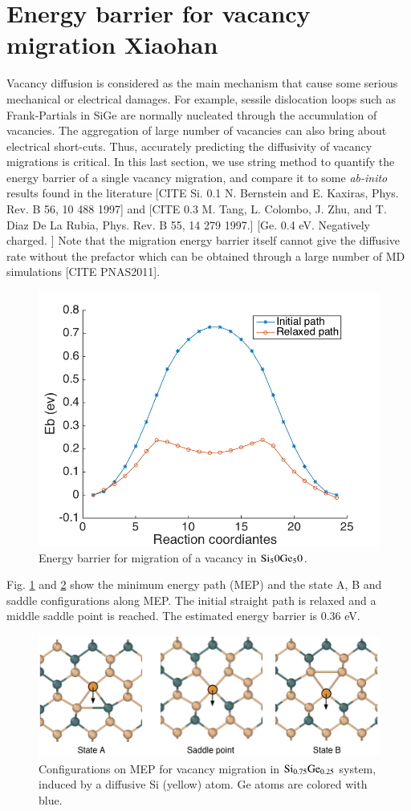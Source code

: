 \documentclass[review]{elsarticle}
\begin{document}
\section{Energy barrier for vacancy migration  {\color{red} Xiaohan}}
\label{sec:vacancy}
Vacancy diffusion is considered as the main mechanism that cause some serious mechanical or electrical damages. For example,  sessile dislocation loops such as Frank-Partials in SiGe are normally nucleated through the accumulation of vacancies. The aggregation of large number of vacancies can also bring about electrical short-cuts. Thus, accurately predicting the diffusivity of vacancy migrations is critical. In this last section, we use string method to quantify the energy barrier of a single vacancy migration, and compare it to some {\it ab-inito} results found in the literature [CITE Si. 0.1 N. Bernstein and E. Kaxiras, Phys. Rev. B 56, 10 488 1997] 
and [CITE 0.3 M. Tang, L. Colombo, J. Zhu, and T. Diaz De La Rubia, Phys. Rev. B 55, 14 279 1997.] [Ge. 0.4 eV. Negatively charged. ] Note that the migration energy barrier itself cannot give the diffusive rate without the prefactor which can be obtained through a large number of MD simulations [CITE PNAS2011]. 

\begin{figure}[H]
\centering
\includegraphics[width=.5\linewidth]{Figures/Eb_migration.png}
\caption{Energy barrier for migration of a vacancy in ${\rm Si_50Ge_50}$.}
\label{fig:Eb_migration}
\end{figure}

Fig. \ref{fig:Eb_migration} and \ref{fig:stateABS} show the minimum energy path (MEP) and the state A, B and saddle configurations along MEP. The initial straight path is relaxed and a middle saddle point is reached. The estimated energy barrier is 0.36 eV. 

\begin{figure}[H]
\centering
\includegraphics[width=.85\linewidth]{Figures/stateABS.png}
\caption{Configurations on MEP for vacancy migration in ${\rm Si_{0.75} Ge_{0.25} }$ system, induced by a diffusive Si (yellow) atom. Ge atoms are colored with blue.}
\label{fig:stateABS}
\end{figure}
\end{document}
